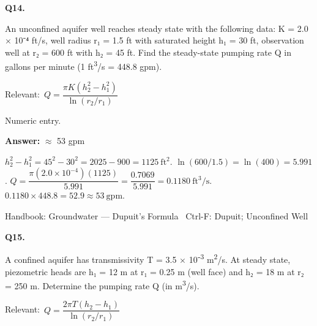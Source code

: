 \documentclass[11pt]{article}
\begin{document}
\vspace{9pt}
\filbreak
\textbf{\color{accent}Q14.}\par\vspace{2pt}
An unconfined aquifer well reaches steady state with the following data: K = 2.0 $\times$ 10⁻⁴ ft/s, well radius r₁ = 1.5 ft with saturated height h₁ = 30 ft, observation well at r₂ = 600 ft with h₂ = 45 ft. Find the steady-state pumping rate Q in gallons per minute (1 ft\textsuperscript{3}/s = 448.8 gpm).\par\vspace{3pt}
{\small\color{soft}Relevant:}\ $Q = \dfrac{\pi K(h_2^{2}-h_1^{2})}{\ln(r_2/r_1)}$\par\vspace{3pt}
{\small\color{soft}Numeric entry.}\par\vspace{3pt}
\vspace{2pt}\par\noindent\colorbox{boxbg}{\parbox{\dimexpr\linewidth-2\fboxsep\relax}{%
\vspace{2pt}\textbf{Answer:} $\approx$ 53 gpm\par\vspace{2pt}
{\small $h_2^2 - h_1^2 = 45^2 - 30^2 = 2025 - 900 = 1125\ \mathrm{ft^2}$.  $\ln(600/1.5) = \ln(400) = 5.991$.  $Q = \dfrac{\pi(2.0\times10^{-4})(1125)}{5.991} = \dfrac{0.7069}{5.991} = 0.1180\ \mathrm{ft^3/s}$.  $0.1180\times448.8 = 52.9 \approx 53\ \mathrm{gpm}$.}\par\vspace{2pt}
{\footnotesize\color{soft}Handbook: Groundwater --- Dupuit's Formula \textbullet\ Ctrl-F: Dupuit; Unconfined Well}\vspace{2pt}
}}
\vspace{9pt}
\filbreak
\textbf{\color{accent}Q15.}\par\vspace{2pt}
A confined aquifer has transmissivity T = 3.5 $\times$ 10⁻\textsuperscript{3} m\textsuperscript{2}/s. At steady state, piezometric heads are h₁ = 12 m at r₁ = 0.25 m (well face) and h₂ = 18 m at r₂ = 250 m. Determine the pumping rate Q (in m\textsuperscript{3}/s).\par\vspace{3pt}
{\small\color{soft}Relevant:}\ $Q = \dfrac{2\pi T(h_2-h_1)}{\ln(r_2/r_1)}$\par\vspace{3pt}
\end{document}
